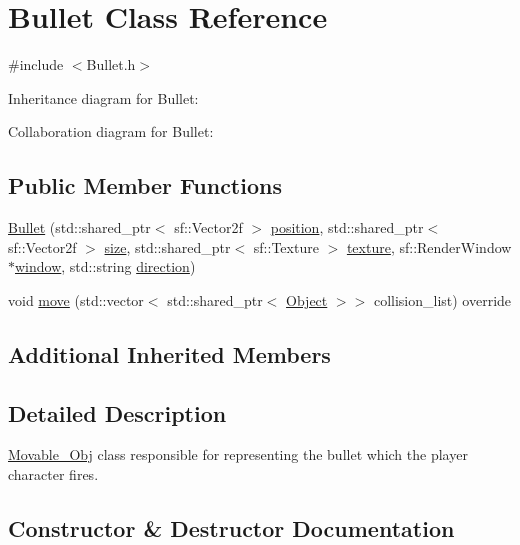 \hypertarget{classBullet}{}\section{Bullet Class Reference}
\label{classBullet}


{\ttfamily \#include $<$Bullet.\+h$>$}



Inheritance diagram for Bullet\+:


Collaboration diagram for Bullet\+:
\subsection*{Public Member Functions}
\begin{DoxyCompactItemize}
\item 
\hyperlink{classBullet_acde2d08c971829da1e9fb565635dce3d}{Bullet} (std\+::shared\+\_\+ptr$<$ sf\+::\+Vector2f $>$ \hyperlink{classObject_a8b1724482fb412feb64a638038161b7a}{position}, std\+::shared\+\_\+ptr$<$ sf\+::\+Vector2f $>$ \hyperlink{classObject_ac8bfde5d0428d9c091854fe1a09b7d9f}{size}, std\+::shared\+\_\+ptr$<$ sf\+::\+Texture $>$ \hyperlink{classObject_a8ff6491b841d0f48da3d98041fbca934}{texture}, sf\+::\+Render\+Window $\ast$\hyperlink{classObject_a5c6cfc086ea1e39e0b3cf8633a763bf8}{window}, std\+::string \hyperlink{classMovable__Obj_a4f4eb3171656831c1f0b8dbab2b2a00c}{direction})
\item 
void \hyperlink{classBullet_a00c0fec9c45ab1ab2b5883404d1bda62}{move} (std\+::vector$<$ std\+::shared\+\_\+ptr$<$ \hyperlink{classObject}{Object} $>$$>$ collision\+\_\+list) override
\end{DoxyCompactItemize}
\subsection*{Additional Inherited Members}


\subsection{Detailed Description}
\hyperlink{classMovable__Obj}{Movable\+\_\+\+Obj} class responsible for representing the bullet which the player character fires. 

\subsection{Constructor \& Destructor Documentation}
\mbox{\label{classBullet_acde2d08c971829da1e9fb565635dce3d}} 

